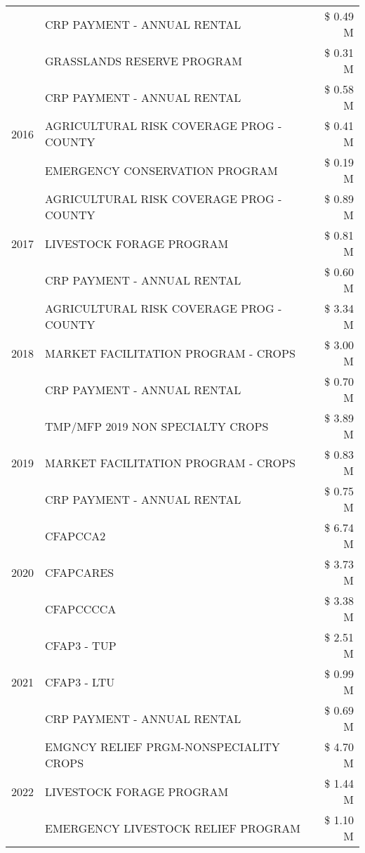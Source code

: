 \begin{tabular}{llr}
 & CRP PAYMENT - ANNUAL RENTAL & \$ 0.49 M \\
 & GRASSLANDS RESERVE PROGRAM & \$ 0.31 M \\
\cline{1-3}
\multirow[t]{3}{*}{2016} & CRP PAYMENT - ANNUAL RENTAL & \$ 0.58 M \\
 & AGRICULTURAL RISK COVERAGE PROG - COUNTY & \$ 0.41 M \\
 & EMERGENCY CONSERVATION PROGRAM & \$ 0.19 M \\
\cline{1-3}
\multirow[t]{3}{*}{2017} & AGRICULTURAL RISK COVERAGE PROG - COUNTY & \$ 0.89 M \\
 & LIVESTOCK FORAGE PROGRAM & \$ 0.81 M \\
 & CRP PAYMENT - ANNUAL RENTAL & \$ 0.60 M \\
\cline{1-3}
\multirow[t]{3}{*}{2018} & AGRICULTURAL RISK COVERAGE PROG - COUNTY & \$ 3.34 M \\
 & MARKET FACILITATION PROGRAM - CROPS & \$ 3.00 M \\
 & CRP PAYMENT - ANNUAL RENTAL & \$ 0.70 M \\
\cline{1-3}
\multirow[t]{3}{*}{2019} & TMP/MFP 2019 NON SPECIALTY CROPS & \$ 3.89 M \\
 & MARKET FACILITATION PROGRAM - CROPS & \$ 0.83 M \\
 & CRP PAYMENT - ANNUAL RENTAL & \$ 0.75 M \\
\cline{1-3}
\multirow[t]{3}{*}{2020} & CFAPCCA2 & \$ 6.74 M \\
 & CFAPCARES & \$ 3.73 M \\
 & CFAPCCCCA & \$ 3.38 M \\
\cline{1-3}
\multirow[t]{3}{*}{2021} & CFAP3 - TUP & \$ 2.51 M \\
 & CFAP3 - LTU & \$ 0.99 M \\
 & CRP PAYMENT - ANNUAL RENTAL & \$ 0.69 M \\
\cline{1-3}
\multirow[t]{3}{*}{2022} & EMGNCY RELIEF PRGM-NONSPECIALITY CROPS & \$ 4.70 M \\
 & LIVESTOCK FORAGE PROGRAM & \$ 1.44 M \\
 & EMERGENCY LIVESTOCK RELIEF PROGRAM & \$ 1.10 M \\
\cline{1-3}
\bottomrule
\end{tabular}
